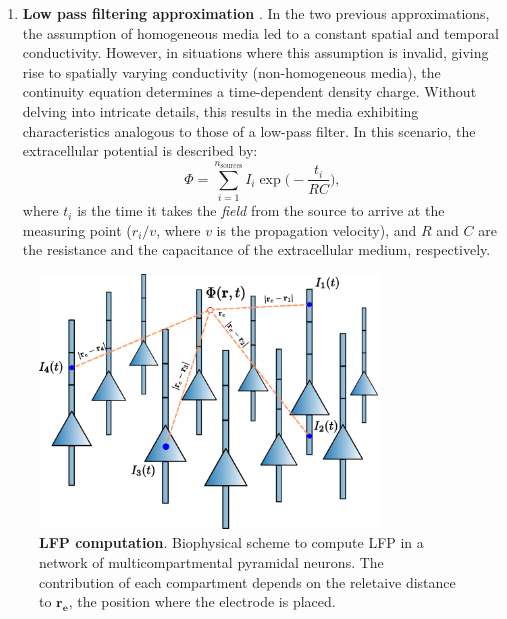 \documentclass[../main.tex]{subfiles}
\begin{document}
\begin{enumerate}
\item \textbf{Low pass filtering approximation} \citep{bedard_modeling_2004}.
In the two previous approximations, the assumption of homogeneous media led to a constant spatial and temporal conductivity.
However, in situations where this assumption is invalid, giving rise to spatially varying conductivity (non-homogeneous media), the continuity equation determines a time-dependent density charge.
Without delving into intricate details, this results in the media exhibiting characteristics analogous to those of a low-pass filter.
In this scenario, the extracellular potential is described by:
\begin{equation}
    \Phi = \sum_{i=1}^{n_\text{sources}}I_i \exp\Big(-\displaystyle\frac{t_i}{RC} \Big),
     \label{eq:low-pass-approximation}
\end{equation}
where $t_i$ is the time it takes the \textit{field} from the source to arrive at the measuring point ($r_i/v$, where $v$ is the propagation velocity), and $R$ and $C$ are the resistance and the capacitance of the extracellular medium, respectively.
\end{enumerate}
\begin{figure}[!htb]
    \centering
    \includegraphics[width=0.8\textwidth]{chapter1/figures/LFP-schematics-2.png}
    \caption{\textbf{LFP computation}.
    Biophysical scheme to compute LFP in a network of multicompartmental pyramidal neurons.
    The contribution of each compartment depends on the reletaive distance to $\mathbf{r_e}$, the position where the electrode is placed.}
    \label{fig:LFP-measurement}
\end{figure}
\end{document}
